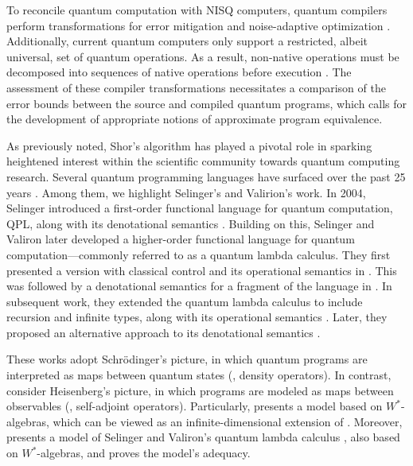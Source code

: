 To reconcile quantum computation with NISQ computers, quantum compilers perform transformations for error mitigation \cite{wallman2016noise} and noise-adaptive optimization \cite{murali2019noise}. Additionally, current quantum computers only support a restricted, albeit universal, set of quantum operations. As a result, non-native operations must be decomposed into sequences of native operations before execution \cite{harrow2002efficient,burgholzer2020advanced}. The assessment of these compiler transformations necessitates a comparison of the error bounds between the source and compiled quantum programs, which calls for the development of appropriate notions of approximate program equivalence.



As previously noted, Shor's algorithm has played a pivotal role in sparking heightened interest within the scientific community towards quantum computing research. Several quantum programming languages have surfaced over the past 25 years \cite{zhao2020quantum,serrano2022quantum}. Among them, we highlight Selinger's and Valirion's work. In 2004, Selinger introduced a first-order functional language for quantum computation, QPL, along with its denotational semantics \cite{selinger2004towards}. Building on this, Selinger and Valiron later developed a higher-order functional language for quantum computation—commonly referred to as a quantum lambda calculus. They first presented a version with classical control and its operational semantics in \cite{selinger2006lambda}. This was followed by a denotational semantics for a fragment of the language in \cite{selinger2008fully}. In subsequent work, they extended the quantum lambda calculus to include recursion and infinite types, along with its operational semantics \cite{selinger2009quantum}. Later, they proposed an alternative approach to its denotational semantics \cite{selinger2014}.


These works adopt Schr\"odinger's picture, in which quantum programs are interpreted as maps between quantum states (\ie, density operators). In contrast, \cite{choSemanticsQuantumProgramming2016, choNeumannAlgebrasForm2016} consider Heisenberg's picture, in which programs are modeled as maps between observables (\ie, self-adjoint operators). Particularly, \cite{choSemanticsQuantumProgramming2016} presents a model based on $W^*$-algebras, which can be viewed as an infinite-dimensional extension of \cite{selinger2004towards}. Moreover, \cite{choNeumannAlgebrasForm2016} presents a model of Selinger and Valiron’s quantum lambda calculus \cite{selinger2006lambda, selinger2008linear, selinger2009quantum}, also based on $W^*$-algebras, and proves the model's adequacy.



